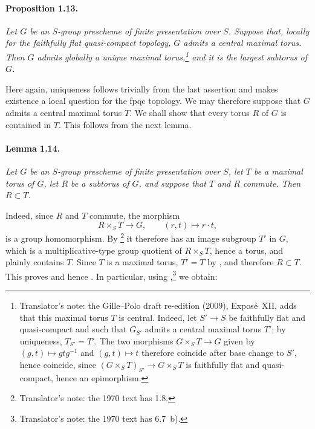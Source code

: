 \paragraph{\textbf{Proposition 1.13.}}
\emph{Let \(G\) be an \(S\)-group prescheme of finite presentation
over \(S\). Suppose that, locally for the faithfully flat
quasi-compact topology, \(G\) admits a central maximal torus. Then
\(G\) admits globally a unique maximal torus,\footnote{Translator's note: the Gille--Polo draft
re-edition (2009), Exposé~XII, adds that this maximal torus \(T\) is central. Indeed, let \(S'\to S\)
be faithfully flat and quasi-compact and such that \(G_{S'}\) admits a central maximal torus \(T'\);
by uniqueness, \(T_{S'}=T'\). The two morphisms \(G\times_ST\to G\) given by
\((g,t)\mapsto gtg^{-1}\) and \((g,t)\mapsto t\) therefore coincide after base change to \(S'\), hence
coincide, since \((G\times_ST)_{S'}\to G\times_ST\) is faithfully flat and quasi-compact, hence an
epimorphism.} and it is the largest subtorus of \(G\).}

Here again, uniqueness follows trivially from the last assertion and
makes existence a local question for the fpqc topology. We may
therefore suppose that \(G\) admits a central maximal torus \(T\). We
shall show that every torus \(R\) of \(G\) is contained in \(T\). This
follows from the next lemma.

\paragraph{\textbf{Lemma 1.14.}}
\emph{Let \(G\) be an \(S\)-group prescheme of finite presentation
over \(S\), let \(T\) be a maximal torus of \(G\), let \(R\) be a
subtorus of \(G\), and suppose that \(T\) and \(R\) commute. Then
\(R\subset T\).}

Indeed, since \(R\) and \(T\) commute, the morphism
\[
  R\times_S T\longrightarrow G,\qquad (r,t)\longmapsto r\cdot t,
\]
is a group homomorphism. By \footnote{Translator's note: the 1970 text has 1.8.} it therefore has an image subgroup
\(T'\) in \(G\), which is a multiplicative-type group quotient of
\(R\times_S T\), hence a torus, and plainly contains \(T\). Since
\(T\) is a maximal torus, \(T'=T\) by , and therefore
\(R\subset T\). This proves  and hence . In particular, using
,\footnote{Translator's note: the 1970 text has 6.7~b).} we obtain:

